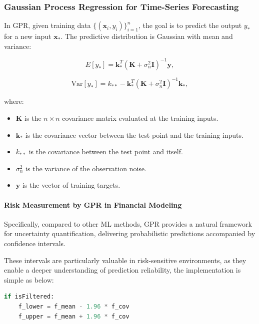 \subsubsection{Gaussian Process Regression for Time-Series Forecasting}

In GPR, given training data $\{ (\mathbf{x}_i, y_i) \}_{i=1}^n$, the goal is to predict the output $y_*$ for a new input $\mathbf{x}_*$. The predictive distribution is Gaussian with mean and variance:

\begin{equation}
    E[y_*] = \mathbf{k}_*^T (\mathbf{K} + \sigma_n^2 \mathbf{I})^{-1} \mathbf{y},
\end{equation}

\begin{equation}
    \text{Var}[y_*] = k_{**} - \mathbf{k}_*^T (\mathbf{K} + \sigma_n^2 \mathbf{I})^{-1} \mathbf{k}_*,
\end{equation}

where:

\begin{itemize}
    \item $\mathbf{K}$ is the $n \times n$ covariance matrix evaluated at the training inputs.
    \item $\mathbf{k}_*$ is the covariance vector between the test point and the training inputs.
    \item $k_{**}$ is the covariance between the test point and itself.
    \item $\sigma_n^2$ is the variance of the observation noise.
    \item $\mathbf{y}$ is the vector of training targets.
\end{itemize}

\paragraph{Risk Measurement by GPR in Financial Modeling}

Specifically, compared to other \ac{ML} methods, \ac{GPR} provides a natural framework for uncertainty quantification, delivering probabilistic predictions accompanied by confidence intervals. 

These intervals are particularly valuable in risk-sensitive environments, as they enable a deeper understanding of prediction reliability, the implementation is simple as below: 

\begin{lstlisting}[language=Python]
if isFiltered:
    f_lower = f_mean - 1.96 * f_cov
    f_upper = f_mean + 1.96 * f_cov
\end{lstlisting}

